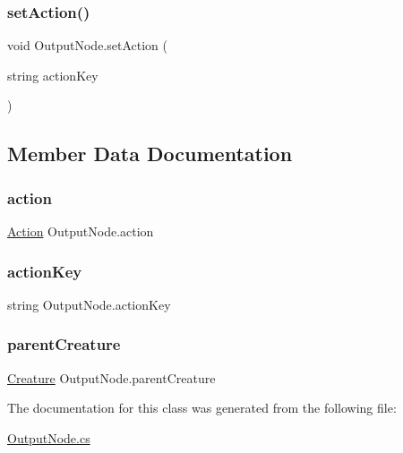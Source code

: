 \mbox{\label{class_output_node_aeb94c02a334d514de5a0bcb474778f41}} 
\subsubsection{\texorpdfstring{set\+Action()}{setAction()}}
{\footnotesize\ttfamily void Output\+Node.\+set\+Action (\begin{DoxyParamCaption}\item[{string}]{action\+Key }\end{DoxyParamCaption})}



\subsection{Member Data Documentation}
\mbox{\label{class_output_node_a330eb0533baf20b237f93627106d6b56}} 
\subsubsection{\texorpdfstring{action}{action}}
{\footnotesize\ttfamily \mbox{\hyperlink{class_action}{Action}} Output\+Node.\+action}

\mbox{\label{class_output_node_a48299e62ef82f692d8656d0efec1b236}} 
\subsubsection{\texorpdfstring{action\+Key}{actionKey}}
{\footnotesize\ttfamily string Output\+Node.\+action\+Key}

\mbox{\label{class_output_node_a4be36782d750ac8d91c0f51628d353fb}} 
\subsubsection{\texorpdfstring{parent\+Creature}{parentCreature}}
{\footnotesize\ttfamily \mbox{\hyperlink{class_creature}{Creature}} Output\+Node.\+parent\+Creature}



The documentation for this class was generated from the following file\+:\begin{DoxyCompactItemize}
\item 
\mbox{\hyperlink{_output_node_8cs}{Output\+Node.\+cs}}\end{DoxyCompactItemize}
